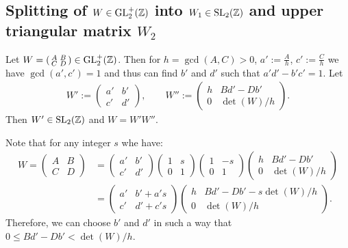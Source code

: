\documentclass{article}
\begin{document}
\subsection{Splitting of $W \in \mathrm{GL}_2^+(\mathbb{Z})$ into
  $W_1\in \SL2Z$ and upper triangular matrix $W_2$}

\begin{Lemma}
  \label{thm:W-splitting}
  Let
  $W=\left(\begin{smallmatrix}A&B\\C&D\end{smallmatrix}\right) \in
  \mathrm{GL}_2^+(\mathbb{Z})$.
  Then for $h=\gcd(A, C)>0$, $a':=\frac{A}{h}$, $c':=\frac{C}{h}$ we
  have $\gcd(a', c')=1$ and thus can find $b'$ and $d'$ such that
  $a'd'-b'c'=1$.
  Let
  \begin{gather*}
    W':=\begin{pmatrix}a'&b'\\c'&d'\end{pmatrix},
    \qquad
    W''
    :=
    \begin{pmatrix}
      h &B d'-D b'\\
      0 & \det(W) / h
    \end{pmatrix}.
  \end{gather*}
  Then $W'\in \SL2Z$ and $W = W' W''$.
\end{Lemma}


Note that for any integer $s$ whe have:
\begin{align}
W = \begin{pmatrix}A&B\\C&D\end{pmatrix}
&=\begin{pmatrix}a'&b'\\c'&d'\end{pmatrix}
  \begin{pmatrix}1& s\\0&1\end{pmatrix}
  \begin{pmatrix}1&-s\\0&1\end{pmatrix}
  \begin{pmatrix}h &B d'- D b'\\0 &\det(W) / h\end{pmatrix}
  \\
&=
  \begin{pmatrix} a'&b' + a' s\\ c'&d' + c' s \end{pmatrix}
  \begin{pmatrix}
    h &B d'- D b'- s \det(W) / h\\
    0 &\det(W) / h\end{pmatrix}.
\end{align}
Therefore, we can choose $b'$ and $d'$ in such a way that
$0 \le B d'-D b' < \det(W)/h$.
\end{document}
